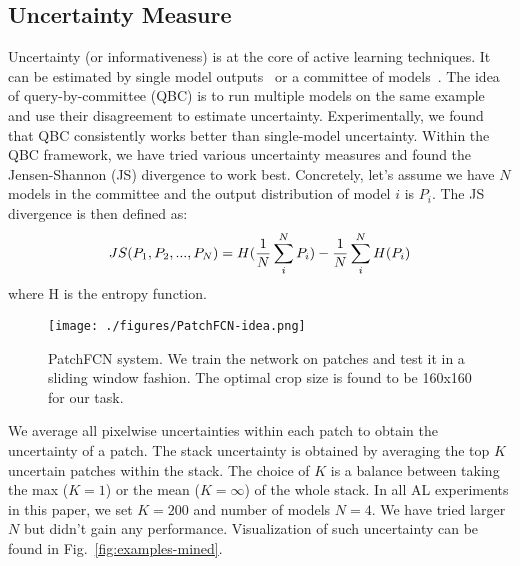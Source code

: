 \documentclass{llncs}
\begin{document}
\subsection{Uncertainty Measure}
\label{sec:uncertainty}
\vspace*{-0.05cm}
Uncertainty (or informativeness) is at the core of active learning techniques. It can be estimated by single model outputs~\cite{lewis1994sequential} or a committee of models~\cite{seung1992query}. The idea of query-by-committee (QBC) is to run multiple models on the same example and use their disagreement to estimate uncertainty. Experimentally, we found that QBC consistently works better than single-model uncertainty.
Within the QBC framework, we have tried various uncertainty measures and found the 
Jensen-Shannon (JS) divergence to work best. Concretely, let's assume we have $N$ models in the committee and the output distribution of model $i$ is $P_i$. The JS divergence is then defined as: 
\vspace*{-0.3cm}
\begin{equation}
  JS(P_1,P_2,...,P_N) = H(\frac{1}{N}\sum_i^{N}P_i) - \frac{1}{N}\sum_i^{N}H(P_i)
\vspace*{-0.3cm}
\end{equation}
where H is the entropy function.

\begin{figure}[t]
    \centering
    \texttt{[image: ./figures/PatchFCN-idea.png]}
    \vspace*{-0.3cm}
    \caption{PatchFCN system. We train the network on patches and test it in a sliding window fashion. The optimal crop size is found to be 160x160 for our task. %
    }
    \vspace*{-0.2cm}
    \label{fig:patch-fcn}
\end{figure}

We average all pixelwise uncertainties within each patch to obtain the uncertainty of a patch. The stack uncertainty is obtained by averaging the top $K$ uncertain patches within the stack. The choice of $K$ is a balance between taking the max ($K=1$) or the mean ($K=\infty$) of the whole stack. In all AL experiments in this paper, we set $K=200$ and number of models $N=4$. We have tried larger $N$ but didn't gain any performance. Visualization of such uncertainty can be found in Fig.~\ref{fig:examples-mined}.
\end{document}
